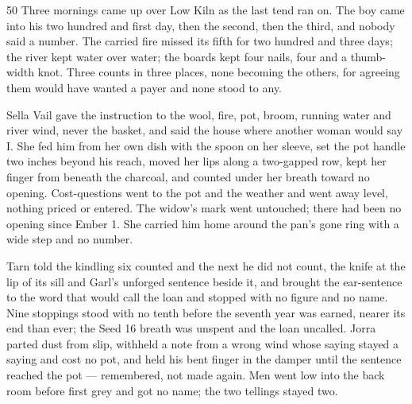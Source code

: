 
\scenebreak


\scenebreak


\scenebreak

\CRtailpiece
\begin{CRchronicle}{50}
Three mornings came up over Low Kiln as the last tend ran on. The boy came into his two hundred and first day, then the second, then the third, and nobody said a number. The carried fire missed its fifth for two hundred and three days; the river kept water over water; the boards kept four nails, four and a thumb-width knot. Three counts in three places, none becoming the others, for agreeing them would have wanted a payer and none stood to any.

Sella Vail gave the instruction to the wool, fire, pot, broom, running water and river wind, never the basket, and said the house where another woman would say I. She fed him from her own dish with the spoon on her sleeve, set the pot handle two inches beyond his reach, moved her lips along a two-gapped row, kept her finger from beneath the charcoal, and counted under her breath toward no opening. Cost-questions went to the pot and the weather and went away level, nothing priced or entered. The widow’s mark went untouched; there had been no opening since Ember 1. She carried him home around the pan’s gone ring with a wide step and no number.

Tarn told the kindling six counted and the next he did not count, the knife at the lip of its sill and Garl’s unforged sentence beside it, and brought the ear-sentence to the word that would call the loan and stopped with no figure and no name. Nine stoppings stood with no tenth before the seventh year was earned, nearer its end than ever; the Seed 16 breath was unspent and the loan uncalled. Jorra parted dust from slip, withheld a note from a wrong wind whose saying stayed a saying and cost no pot, and held his bent finger in the damper until the sentence reached the pot --- remembered, not made again. Men went low into the back room before first grey and got no name; the two tellings stayed two.


\end{CRchronicle}
